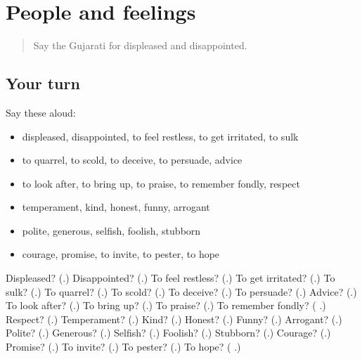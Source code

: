 \section[(dialogue)]{People and feelings}

\label{lesson:GU-R272-review-267-272}



\begin{quote}
Say the Gujarati for displeased and disappointed.
\end{quote}

\subsection*{Your turn}
Say these aloud:

\begin{itemize}
\raggedright
  \item displeased, disappointed, to feel restless, to get irritated, to sulk
  \item to quarrel, to scold, to deceive, to persuade, advice
  \item to look after, to bring up, to praise, to remember fondly, respect
  \item temperament, kind, honest, funny, arrogant
  \item polite, generous, selfish, foolish, stubborn
  \item courage, promise, to invite, to pester, to hope
\end{itemize}

\begin{tcolorbox}[breakable,colback=teal!4,colframe=teal!35!black,title={Before you move on}]
Displeased? (\textbf{}.) Disappointed? (\textbf{}.) To feel restless? (\textbf{}.) To get irritated? (\textbf{}.) To sulk? (\textbf{}.) To quarrel? (\textbf{}.) To scold? (\textbf{}.) To deceive? (\textbf{}.) To persuade? (\textbf{}.) Advice? (\textbf{}.) To look after? (\textbf{}.) To bring up? (\textbf{}.) To praise? (\textbf{}.) To remember fondly? (\textbf{ }.) Respect? (\textbf{}.) Temperament? (\textbf{}.) Kind? (\textbf{}.) Honest? (\textbf{}.) Funny? (\textbf{}.) Arrogant? (\textbf{}.) Polite? (\textbf{}.) Generous? (\textbf{}.) Selfish? (\textbf{}.) Foolish? (\textbf{}.) Stubborn? (\textbf{}.) Courage? (\textbf{}.) Promise? (\textbf{}.) To invite? (\textbf{}.) To pester? (\textbf{}.) To hope? (\textbf{ }.)
\end{tcolorbox}
